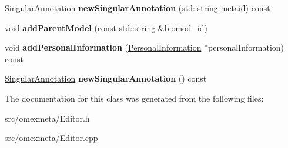 \begin{DoxyCompactItemize}
\hyperlink{classomexmeta_1_1Triple}{Singular\+Annotation} {\bfseries new\+Singular\+Annotation} (std\+::string metaid) const
\item 
\mbox{\label{classomexmeta_1_1Editor_ad7240613a1f3e215af6e4a05d121508c}} 
void {\bfseries add\+Parent\+Model} (const std\+::string \&biomod\+\_\+id)
\item 
\mbox{\label{classomexmeta_1_1Editor_ae97ebb9bb2bc3ebd7d3b0a5eca9dfb0f}} 
void {\bfseries add\+Personal\+Information} (\hyperlink{classomexmeta_1_1PersonalInformation}{Personal\+Information} $\ast$personal\+Information) const
\item 
\mbox{\label{classomexmeta_1_1Editor_a6142da2b89068e9638410c3c903e3b64}} 
\hyperlink{classomexmeta_1_1Triple}{Singular\+Annotation} {\bfseries new\+Singular\+Annotation} () const
\end{DoxyCompactItemize}


The documentation for this class was generated from the following files\+:\begin{DoxyCompactItemize}
\item 
src/omexmeta/Editor.\+h\item 
src/omexmeta/Editor.\+cpp\end{DoxyCompactItemize}
